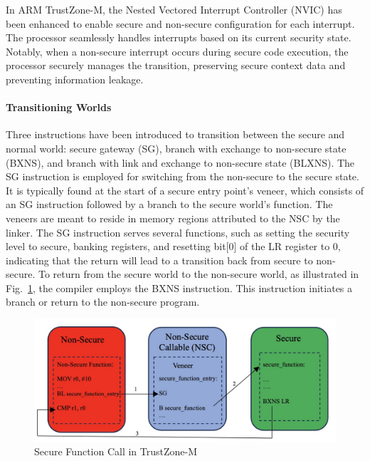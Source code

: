 In ARM TrustZone-M, the Nested Vectored Interrupt Controller (NVIC) has
been enhanced to enable secure and non-secure configuration for each
interrupt. The processor seamlessly handles interrupts based on its current
security state. Notably, when a non-secure interrupt occurs during secure
code execution, the processor securely manages the transition, preserving
secure context data and preventing information leakage.

\paragraph{\textbf{Transitioning Worlds}} Three instructions have been
introduced to transition between the secure and normal world: secure
gateway (\ac{SG}), branch with exchange to non-secure state (\ac{BXNS}),
and branch with link and exchange to non-secure state (\ac{BLXNS}). The
\ac{SG} instruction is employed for switching from the non-secure to the
secure state. It is typically found at the start of a secure entry point's
veneer, which consists of an \ac{SG} instruction followed by a branch to
the secure world's function. The veneers are meant to reside in memory
regions attributed to the \ac{NSC} by the linker. The \ac{SG} instruction
serves several functions, such as setting the security level to secure,
banking registers, and resetting bit[0] of the LR register to 0, indicating
that the return will lead to a transition back from secure to non-secure.
To return from the secure world to the non-secure world, as illustrated in
Fig.~\ref{fig:Ttansition}, the compiler employs the \ac{BXNS} instruction.
This instruction initiates a branch or return to the non-secure program.

\begin{figure}
  \centering
  \includegraphics[width=\columnwidth]{figures/SFC.jpg}
  \caption{Secure Function Call in TrustZone-M}
  \label{fig:Ttansition}
\end{figure}

